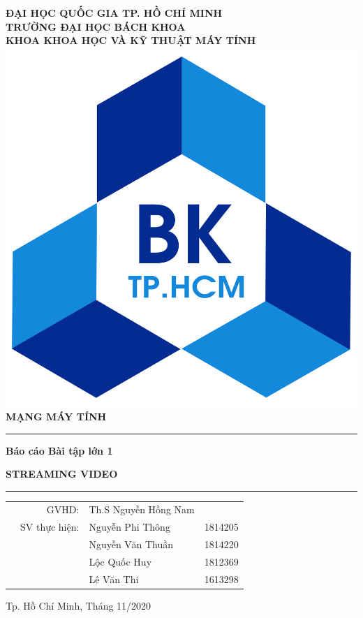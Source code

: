 \documentclass[12pt,a4paper]{article}
\begin{document}
\begin{titlepage}
\begin{center}
\large\textbf{ĐẠI HỌC QUỐC GIA TP. HỒ CHÍ MINH\\
TRƯỜNG ĐẠI HỌC BÁCH KHOA\\
KHOA KHOA HỌC VÀ KỸ THUẬT MÁY TÍNH}\\
\vspace{1.5cm}
\includegraphics[scale=0.09]{hcmut.png} \\
\vspace{1.5cm}
\LARGE{\textbf{MẠNG MÁY TÍNH}}\\
\vspace{1.7cm}
\rule{15cm}{0.06cm}
\begin{flushleft}
\hspace{1cm}
\Large\textbf{Báo cáo Bài tập lớn 1}
\end{flushleft}
\LARGE\textbf{STREAMING VIDEO}
\rule{15cm}{0.06cm}
\end{center}
\vspace{1 cm}
\begin{table}[h]
\begin{tabular}{rrll}
\hspace{5 cm} & GVHD: & Th.S Nguyễn Hồng Nam\\
& SV thực hiện: & Nguyễn Phi Thông & 1814205 \\
& & Nguyễn Văn Thuần & 1814220 \\
& & Lộc Quốc Huy & 1812369 \\
& & Lê Văn Thi & 1613298 \\
\end{tabular}
\end{table}
\vspace{1.5cm}
\begin{center}
{\footnotesize Tp. Hồ Chí Minh, Tháng 11/2020}
\end{center}
\end{titlepage}
\tableofcontents
\newpage
\end{document}
